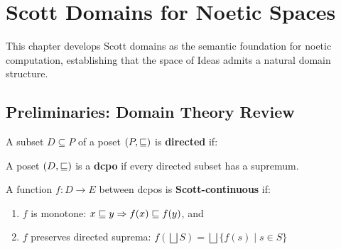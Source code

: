 

\chapter{Scott Domains for Noetic Spaces}
\label{ch:scott-domains-noetic}

\begin{tcolorbox}[colback=blue!5!white,colframe=blue!75!black,title=\vnewfour]
This chapter develops Scott domains as the semantic foundation for noetic
computation, establishing that the space of Ideas admits a natural domain structure.
\end{tcolorbox}

\section{Preliminaries: Domain Theory Review}

\begin{definition}
\label{def:directed-set}
A subset $D \subseteq P$ of a poset $(P, \sqsubseteq)$ is \textbf{directed} if:
\begin{enumerate}[label=(\roman*)}
  \item $D \neq \varnothing$ (nonemptiness), and
  \item For all $x, y \in D$, there exists $z \in D$ with $x \sqleq z$ and $y \sqleq z$.
\end{enumerate}
\end{definition}

\begin{definition}
\label{def:dcpo}
A poset $(D, \sqsubseteq)$ is a \textbf{dcpo} if every directed subset has a supremum.
\end{definition}

\begin{definition}
\label{def:scott-continuous}
A function $f : D \to E$ between dcpos is \textbf{Scott-continuous} if:
\begin{enumerate}[label=(\roman*)]
  \item $f$ is monotone: $x \sqsubseteq y \Rightarrow f(x) \sqsubseteq f(y)$, and
  \item $f$ preserves directed suprema: $f\left(\bigsqcup S\right) = \bigsqcup \{f(s) \mid s \in S\}$
\end{enumerate}
\end{definition}

